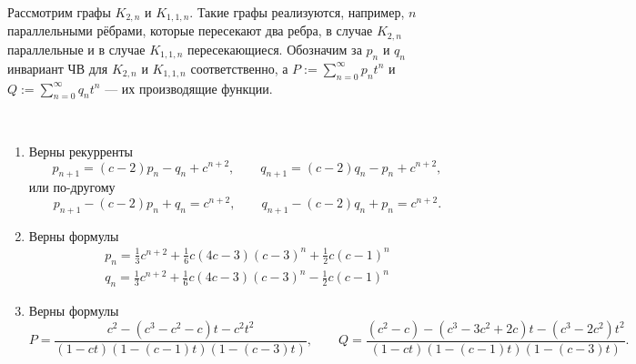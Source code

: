 \documentclass[12pt,a4paper]{article}
\begin{document}
    \begin{definition}
        Рассмотрим графы $K_{2,n}$ и $K_{1,1,n}$. Такие графы реализуются, например, $n$ параллельными рёбрами, которые пересекают два ребра, в случае $K_{2,n}$ параллельные и в случае $K_{1,1,n}$ пересекающиеся. Обозначим за $p_n$ и $q_n$ инвариант ЧВ для $K_{2, n}$ и $K_{1,1,n}$ соответственно, а $P := \sum_{n=0}^\infty p_n t^n$ и $Q := \sum_{n=0}^\infty q_n t^n$ --- их производящие функции.
    \end{definition}

    \begin{lemma}\ 
        \begin{enumerate}
            \item Верны рекурренты
                \[
                    p_{n+1} = (c-2) p_n - q_n + c^{n+2},
                    \qquad
                    q_{n+1} = (c-2) q_n - p_n + c^{n+2},
                \]
                или по-другому
                \[
                    p_{n+1} - (c-2) p_n + q_n = c^{n+2},
                    \qquad
                    q_{n+1} - (c-2) q_n + p_n = c^{n+2}.
                \]
            \item Верны формулы
                \begin{gather*}
                    p_n = \frac{1}{3} c^{n+2} + \frac{1}{6} c (4c-3) (c-3)^n + \frac{1}{2} c (c-1)^n\\
                    q_n = \frac{1}{3} c^{n+2} + \frac{1}{6} c (4c-3) (c-3)^n - \frac{1}{2} c (c-1)^n
                \end{gather*}
            \item Верны формулы
                \[
                    P = \frac{c^2 - (c^3-c^2-c)t - c^2 t^2}{(1-ct)(1-(c-1)t)(1-(c-3)t)},
                    \qquad
                    Q = \frac{(c^2-c) - (c^3-3c^2+2c)t - (c^3-2c^2)t^2}{(1-ct)(1-(c-1)t)(1-(c-3)t)}.
                \]
        \end{enumerate}
    \end{lemma}
\end{document}
